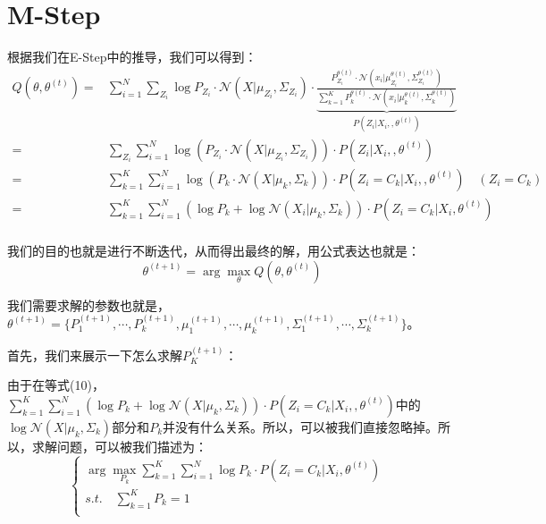 \documentclass[a4paper]{article}
\begin{document}
\section{M-Step}
根据我们在E-Step中的推导，我们可以得到：
\begin{equation}
    \begin{split}
        Q(\theta,\theta^{(t)})  
        = & \sum_{i=1}^N \sum_{Z_i} \log P_{Z_i}\cdot \mathcal{N}(X|\mu_{Z_i},\Sigma_{Z_i}) \cdot \underbrace{\frac{P_{Z_i}^{\theta(t)}\cdot \mathcal{N}(x_i|\mu_{Z_i}^{\theta(t)},\Sigma_{Z_i}^{\theta(t)})}{\sum_{k=1}^K P_k^{\theta(t)}\cdot \mathcal{N}(x_i|\mu_k^{\theta(t)},\Sigma_k^{\theta(t)})}}_{P(Z_i|X_i,,\theta^{(t)})} \\
        = & \sum_{Z_i} \sum_{i=1}^N \log \left( P_{Z_i}\cdot \mathcal{N}(X|\mu_{Z_i},\Sigma_{Z_i}) \right) \cdot P(Z_i|X_i,,\theta^{(t)}) \\
        = & \sum_{k=1}^K \sum_{i=1}^N \log \left( P_{k}\cdot \mathcal{N}(X|\mu_{k},\Sigma_{k}) \right) \cdot P(Z_i = C_k|X_i,,\theta^{(t)}) \quad (Z_i = C_k) \\
        = & \sum_{k=1}^K \sum_{i=1}^N \left( \log P_{k} + \log  \mathcal{N}(X_i|\mu_{k},\Sigma_{k}) \right) \cdot P(Z_i = C_k|X_i,\theta^{(t)}) \\
    \end{split}
\end{equation}

我们的目的也就是进行不断迭代，从而得出最终的解，用公式表达也就是：
\begin{equation}
    \theta^{(t+1)} = \arg\max_{\theta} Q(\theta,\theta^{(t)})
\end{equation}

我们需要求解的参数也就是，$\theta^{(t+1)}=\{ P_1^{(t+1)}, \cdots, P_k^{(t+1)}, \mu_1^{(t+1)}, \cdots, \mu_k^{(t+1)},\Sigma_1^{(t+1)},\cdots,\Sigma_k^{(t+1)} \}$。

首先，我们来展示一下怎么求解$P_K^{(t+1)}$：

由于在等式(10)，$\sum_{k=1}^K \sum_{i=1}^N \left( \log P_{k} + \log  \mathcal{N}(X|\mu_{k},\Sigma_{k}) \right) \cdot P(Z_i = C_k|X_i,,\theta^{(t)})$中的$\log  \mathcal{N}(X|\mu_{k},\Sigma_{k})$部分和$P_k$并没有什么关系。所以，可以被我们直接忽略掉。所以，求解问题，可以被我们描述为：
\begin{equation}
    \left\{
        \begin{array}{ll}
            \arg\max_{P_k} \sum_{k=1}^K \sum_{i=1}^N  \log P_{k} \cdot P(Z_i = C_k|X_i,\theta^{(t)}) & \\
            s.t. \quad \sum_{k=1}^K P_k = 1 & \\
        \end{array}
    \right.
\end{equation}
\end{document}
